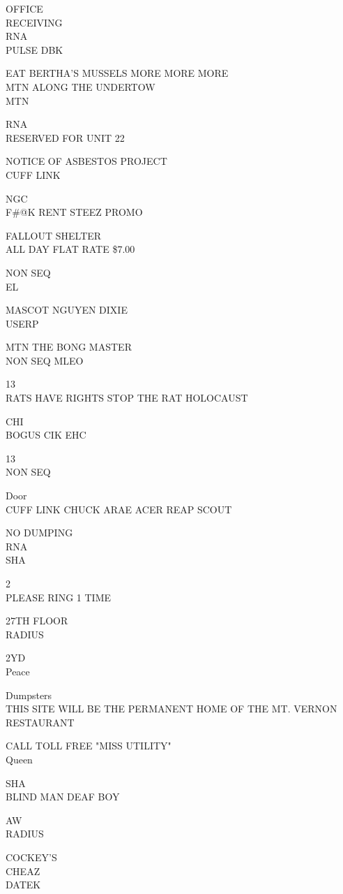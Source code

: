 \documentclass[10pt,letterpaper]{article}
\begin{document}
OFFICE\\
RECEIVING\\
RNA\\
PULSE DBK

EAT BERTHA'S MUSSELS MORE MORE MORE\\
MTN ALONG THE UNDERTOW\\
MTN

RNA\\
RESERVED FOR UNIT 22

NOTICE OF ASBESTOS PROJECT\\
CUFF LINK

NGC\\
F\#@K RENT STEEZ PROMO

FALLOUT SHELTER\\
ALL DAY FLAT RATE \$7.00

NON SEQ\\
EL

MASCOT NGUYEN DIXIE\\
USERP

MTN THE BONG MASTER\\
NON SEQ MLEO

13\\
RATS HAVE RIGHTS STOP THE RAT HOLOCAUST

CHI\\
BOGUS CIK EHC

13\\
NON SEQ

Door\\
CUFF LINK CHUCK ARAE ACER REAP SCOUT

NO DUMPING\\
RNA\\
SHA

2\\
PLEASE RING 1 TIME

27TH FLOOR\\
RADIUS

2YD\\
Peace

Dumpsters\\
THIS SITE WILL BE THE PERMANENT HOME OF THE MT. VERNON RESTAURANT

CALL TOLL FREE "MISS UTILITY"\\
Queen

SHA\\
BLIND MAN DEAF BOY

AW\\
RADIUS

COCKEY'S\\
CHEAZ\\
DATEK
\end{document}
